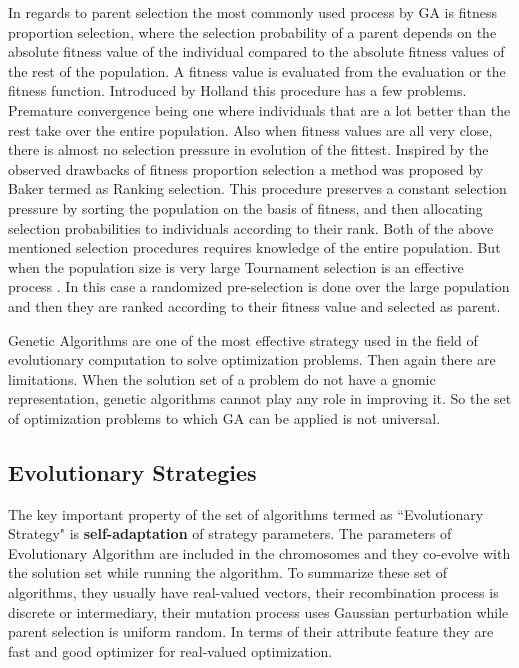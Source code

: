 In regards to parent selection the most commonly used process by GA is fitness proportion selection, where the selection probability of a parent depends on the absolute fitness value of the individual compared to the absolute fitness values of the rest of the population. A fitness value is evaluated from the evaluation or the fitness function. Introduced by Holland \cite{holland1975} this procedure has a few problems. Premature convergence being one where individuals that are a lot better than the rest take over the entire population. Also when fitness values are all very close, there is almost no selection pressure in evolution of the fittest. Inspired by the observed drawbacks of fitness proportion selection a method was proposed by Baker \cite{baker1987} termed as Ranking selection. This procedure preserves a constant selection pressure by sorting the population on the basis of fitness, and then allocating selection probabilities to individuals according to their rank. Both of the above mentioned selection procedures requires knowledge of the entire population. But when the population size is very large Tournament selection is an effective process \cite{eiben2003}. In this case a randomized pre-selection is done over the large population and then they are ranked according to their fitness value and selected as parent. 

Genetic Algorithms are one of the most effective strategy used in the field of evolutionary computation to solve optimization problems. Then again there are limitations. When the solution set of a problem do not have a gnomic representation, genetic algorithms cannot play any role in improving it. So the set of optimization problems to which GA can be applied is not universal.

\subsection{Evolutionary Strategies}
The key important property of the set of algorithms termed as ``Evolutionary Strategy" is \textbf{self-adaptation} of strategy parameters. The  parameters of Evolutionary Algorithm are included in the chromosomes and they co-evolve with the solution set while running the algorithm. To summarize these set of algorithms, they usually have real-valued vectors, their recombination process is discrete or intermediary, their mutation process uses Gaussian perturbation while parent selection is uniform random. In terms of their attribute feature they are fast and good optimizer for real-valued optimization.

